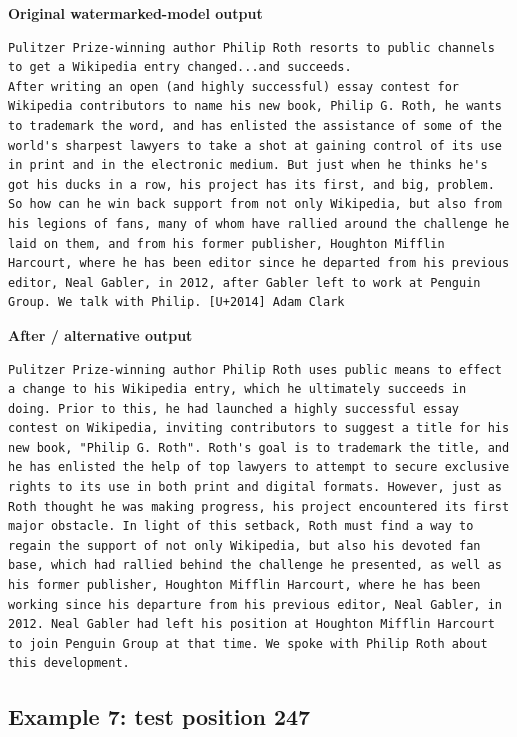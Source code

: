 \textbf{Original watermarked-model output}

\begin{Verbatim}
Pulitzer Prize-winning author Philip Roth resorts to public channels to get a Wikipedia entry changed...and succeeds.
After writing an open (and highly successful) essay contest for Wikipedia contributors to name his new book, Philip G. Roth, he wants to trademark the word, and has enlisted the assistance of some of the world's sharpest lawyers to take a shot at gaining control of its use in print and in the electronic medium. But just when he thinks he's got his ducks in a row, his project has its first, and big, problem. So how can he win back support from not only Wikipedia, but also from his legions of fans, many of whom have rallied around the challenge he laid on them, and from his former publisher, Houghton Mifflin Harcourt, where he has been editor since he departed from his previous editor, Neal Gabler, in 2012, after Gabler left to work at Penguin Group. We talk with Philip. [U+2014] Adam Clark
\end{Verbatim}

\textbf{After / alternative output}

\begin{Verbatim}
Pulitzer Prize-winning author Philip Roth uses public means to effect a change to his Wikipedia entry, which he ultimately succeeds in doing. Prior to this, he had launched a highly successful essay contest on Wikipedia, inviting contributors to suggest a title for his new book, "Philip G. Roth". Roth's goal is to trademark the title, and he has enlisted the help of top lawyers to attempt to secure exclusive rights to its use in both print and digital formats. However, just as Roth thought he was making progress, his project encountered its first major obstacle. In light of this setback, Roth must find a way to regain the support of not only Wikipedia, but also his devoted fan base, which had rallied behind the challenge he presented, as well as his former publisher, Houghton Mifflin Harcourt, where he has been working since his departure from his previous editor, Neal Gabler, in 2012. Neal Gabler had left his position at Houghton Mifflin Harcourt to join Penguin Group at that time. We spoke with Philip Roth about this development.
\end{Verbatim}

\subsection{Example 7: test position
247}\label{record-docs-watermarking-qualitative-paper-sir-vanilla-md-example-7-test-position-247}


